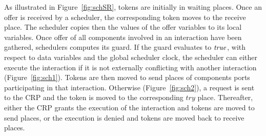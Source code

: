 As illustrated in Figure~\ref{fig:schSR}, tokens are initially in waiting places. Once an offer
is received by a scheduler, the corresponding token moves to the receive place. The scheduler
copies then the values of the offer variables to its local variables. Once offer of all 
components involved in an interaction have been gathered, schedulers computes its guard. If 
the guard evaluates to $\textnormal{\textit{true}}$, with respect to data variables and the global scheduler clock,
the scheduler can either execute the interaction if it is not externally conflicting with
another interaction (Figure~\ref{fig:sch1}). Tokens are then moved to send places of components
ports participating in that interaction. Otherwise (Figure~\ref{fig:sch2}), 
a request is sent to the CRP and the token is moved to the
corresponding $try$ place. Thereafter, either the CRP grants the execution of the interaction
and tokens are moved to send places, or the execution is denied and tokens are moved back
to receive places.


